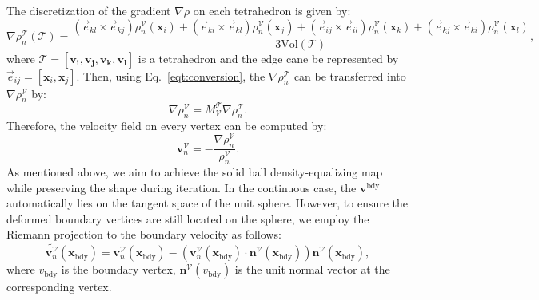 \documentclass{article}
\begin{document}
The discretization of the gradient $\nabla \rho$ on each tetrahedron is given by:
\begin{equation}
    \nabla \rho_n^{\mathcal{T}}(\mathcal{T}) = \frac{(\vec{e}_{kl}\times \vec{e}_{kj})\rho^{\mathcal{V}}_{n}\left(\mathbf{x}_i\right) + (\vec{e}_{ki}\times \vec{e}_{kl})\rho^{\mathcal{V}}_{n}\left(\mathbf{x}_j\right) + (\vec{e}_{ij}\times \vec{e}_{il})\rho^{\mathcal{V}}_{n}\left(\mathbf{x}_k\right) + (\vec{e}_{kj}\times \vec{e}_{ki})\rho^{\mathcal{V}}_{n}\left(\mathbf{x}_l\right)}{3\text{Vol}(\mathcal{T})},
\end{equation}
where $\mathcal{T} = [\mathbf{v_i},\mathbf{v_j},\mathbf{v_k},\mathbf{v_l}]$ is a tetrahedron and the edge cane be represented by $\vec{e}_{ij} = {[\mathbf{x}_i,\mathbf{x}_j]}$. Then, using Eq.~\eqref{eqt:conversion}, the $\nabla \rho_n^{\mathcal{T}}$ can be transferred into $\nabla \rho_n^{\mathcal{V}}$ by:
\begin{equation}
    \nabla \rho_n^{\mathcal{V}} = M^\mathcal{T}_{\mathcal{V}} \nabla \rho_n^{\mathcal{T}}.
\end{equation}
Therefore, the velocity field on every vertex can be computed by:
\begin{equation}\label{eqt:velocity_discrete}
    \mathbf{v}^{\mathcal{V}}_n = -\frac{\nabla \rho_n^{\mathcal{V}}}{\rho_n^{\mathcal{V}}}.
\end{equation}
As mentioned above, we aim to achieve the solid ball density-equalizing map while preserving the shape during iteration. In the continuous case, the $\mathbf{v}^{\text{bdy}}$ automatically lies on the tangent space of the unit sphere. However, to ensure the deformed boundary vertices are still located on the sphere, we employ the Riemann projection to the boundary velocity as follows:
\begin{equation}\label{eqt:velocity_projected_discrete}
    \widetilde{\mathbf{v}^{\mathcal{V}}_n}(\mathbf{x}_{\text{bdy}}) = \mathbf{v}^{\mathcal{V}}_n(\mathbf{x}_{\text{bdy}}) - \left( \mathbf{v}^{\mathcal{V}}_n(\mathbf{x}_{\text{bdy}}) \cdot \mathbf{n}^{\mathcal{V}}(\mathbf{x}_{\text{bdy}}) \right) \mathbf{n}^{\mathcal{V}}(\mathbf{x}_{\text{bdy}}),
\end{equation}
where $v_{\text{bdy}}$ is the boundary vertex, $\mathbf{n}^{\mathcal{V}}(v_{\text{bdy}})$ is the unit normal vector at the corresponding vertex. 
\end{document}
